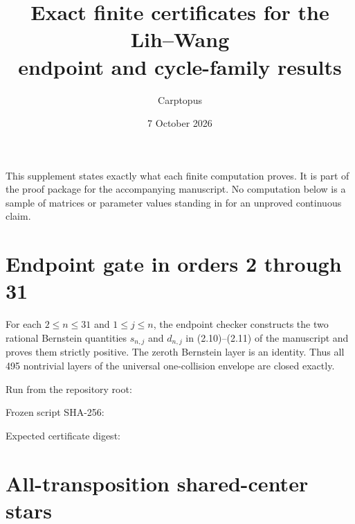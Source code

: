 \documentclass[11pt]{article}
\title{Exact finite certificates for the Lih--Wang\\
endpoint and cycle-family results}
\author{Carptopus}
\date{7 October 2026}
\begin{document}
\maketitle
\begin{center}
\end{center}

This supplement states exactly what each finite computation proves. It is part
of the proof package for the accompanying manuscript. No computation below is a
sample of matrices or parameter values standing in for an unproved continuous
claim.

\section{Endpoint gate in orders 2 through 31}


For each $2\le n\le31$ and $1\le j\le n$, the endpoint checker
constructs the two rational Bernstein quantities $s_{n,j}$ and
$d_{n,j}$ in (2.10)--(2.11) of the manuscript and proves them strictly
positive. The zeroth Bernstein layer is an identity. Thus all 495 nontrivial
layers of the universal one-collision envelope are closed exactly.

Run from the repository root:


Frozen script SHA-256:


Expected certificate digest:


\section{All-transposition shared-center stars}
\end{document}
